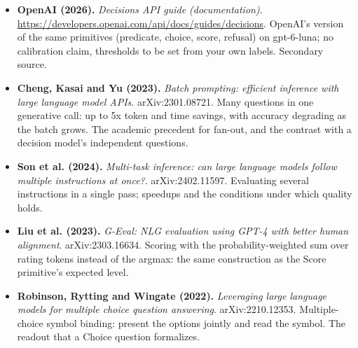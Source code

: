 \documentclass[11pt,letterpaper]{article}
\begin{document}
\begin{itemize}[leftmargin=1.2em,itemsep=3pt]
\item \textbf{OpenAI (2026).} \textit{Decisions API guide (documentation)}. \url{https://developers.openai.com/api/docs/guides/decisions}. OpenAI's version of the same primitives (predicate, choice, score, refusal) on gpt-6-luna; no calibration claim, thresholds to be set from your own labels. Secondary source.
\item \textbf{Cheng, Kasai and Yu (2023).} \textit{Batch prompting: efficient inference with large language model APIs}. arXiv:2301.08721. Many questions in one generative call: up to 5x token and time savings, with accuracy degrading as the batch grows. The academic precedent for fan-out, and the contrast with a decision model's independent questions.
\item \textbf{Son et al. (2024).} \textit{Multi-task inference: can large language models follow multiple instructions at once?}. arXiv:2402.11597. Evaluating several instructions in a single pass; speedups and the conditions under which quality holds.
\item \textbf{Liu et al. (2023).} \textit{G-Eval: NLG evaluation using GPT-4 with better human alignment}. arXiv:2303.16634. Scoring with the probability-weighted sum over rating tokens instead of the argmax: the same construction as the Score primitive's expected level.
\item \textbf{Robinson, Rytting and Wingate (2022).} \textit{Leveraging large language models for multiple choice question answering}. arXiv:2210.12353. Multiple-choice symbol binding: present the options jointly and read the symbol. The readout that a Choice question formalizes.
\end{itemize}
\end{document}
